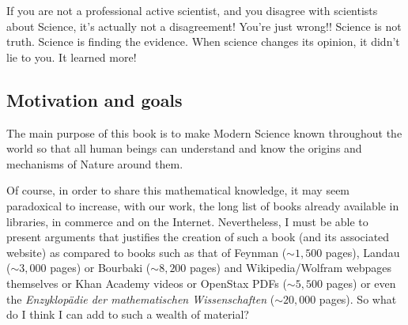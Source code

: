 	\begin{fquote}[?]If you are not a professional active scientist, and you disagree with scientists about Science, it's actually not a disagreement! You're just wrong!! Science is not truth. Science is finding the evidence. When science changes its opinion, it didn't lie to you. It learned more!
 	\end{fquote}
	
	\subsection{Motivation and goals}
	The main purpose of this book is to make Modern Science known throughout the world so that all human beings can understand and know the origins and mechanisms of Nature around them.
	
	Of course, in order to share this mathematical knowledge, it may seem paradoxical to increase, with our work, the long list of books already available in libraries, in commerce and on the Internet. Nevertheless, I must be able to present arguments that justifies the creation of such a book (and its associated website) as compared to books such as that of Feynman ($\sim 1,500$ pages), Landau ($\sim 3,000$ pages) or Bourbaki ($\sim 8,200$ pages) and Wikipedia/Wolfram webpages themselves or Khan Academy videos or OpenStax PDFs ($\sim 5,500$ pages) or even the \textit{Enzyklopädie der mathematischen Wissenschaften} ($\sim 20,000$ pages). So what do I think I can add to such a wealth of material? 
